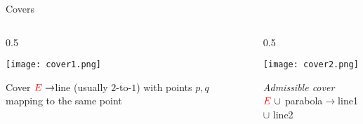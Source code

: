 \documentclass{beamer}
\theoremstyle{definition}
\begin{document}
                                                                                                                                                                                                                          \begin{frame}{Covers}

                                                                                                                                                                                                                            \begin{columns}[c]
        \begin{column}{0.5\hsize}

          \texttt{[image: cover1.png]}

          Cover ${\color{red}E}\to${\color{blue}line} (usually $2$-to-$1$)
          with points {\color{green!40!black}$p,q$} mapping to the same point

        \end{column}
        \begin{column}{0.5\hsize}

          \texttt{[image: cover2.png]}

          {\it Admissible cover}
          \\ ${\color{red}E}\ \cup$ parabola$\to${\color{blue}line1} $\cup$ {\color{orange}line2}

        \end{column}
      \end{columns}
                                                                                                                                                                                                                          \end{frame}
\end{document}
